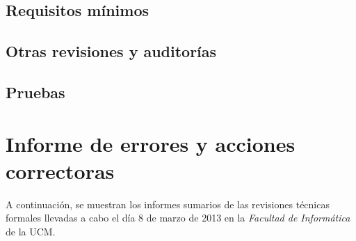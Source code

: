 \documentclass[11pt, a4paper, twoside, titlepage]{article}
\begin{document}
		\subsection{Requisitos mínimos}
		\subsection{Otras revisiones y auditorías}
		\subsection{Pruebas}
	\section{Informe de errores y acciones correctoras}%
		A continuación, se muestran los informes sumarios de las revisiones técnicas formales llevadas a cabo el día 8 de marzo de 2013 en la \textit{Facultad de Informática} de la UCM.
\end{document}
